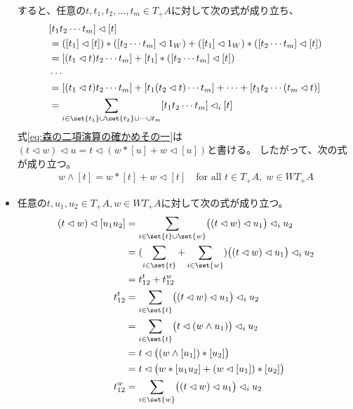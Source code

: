 \begin{itemize}
\begin{equation}
\begin{split}
			\end{split}\end{equation} %
			すると、任意の$t,t_1,t_2,\dots,t_m\in T_+A$に対して次の式が成り立ち、
			\begin{equation*}\begin{split} %
				&[t_1t_2\cdots t_m]\lhd[t] \\
				&= ([t_1]\lhd [t])*([t_2\cdots t_m]\lhd 1_W)
				+ ([t_1]\lhd 1_W)*([t_2\cdots t_m]\lhd [t]) \\
				&= [(t_1\lhd t)t_2\cdots t_m]
				+ [t_1]*([t_2\cdots t_m]\lhd [t]) \\
				&\cdots \\
				&= [(t_1\lhd t)t_2\cdots t_m] + [t_1(t_2\lhd t)\cdots t_m]
				+ \cdots + [t_1t_2\cdots (t_m\lhd t)] \\
				&= \sum_{i\in \set{t_1}\cup\set{t_2}\cup\cdots\cup{t_m}}
				[t_1t_2\cdots t_m]\lhd_i[t]
			\end{split}\end{equation*} %
			式\eqref{eq:森の二項演算の確かめその一}は
			$(t\lhd w)\lhd u=t\lhd (w*[u]+w\lhd[u])$と書ける。
			したがって、次の式が成り立つ。
			\begin{equation}\label{eq:一文字の森の場合の森の二項演算}\begin{split} %
				w\land [t] = w*[t]+w\lhd[t] \quad\text{for all }t\in T_+A,\;w\in WT_+A
			\end{split}\end{equation} %
			\item 任意の$t,u_1,u_2\in T_+A,w\in WT_+A$に対して次の式が成り立つ。
			\begin{equation*}\begin{split} %
				(t\lhd w)\lhd[u_1u_2]
				&= \sum_{i\in \set{t}\cup \set{w}}
					\bigl((t\lhd w)\lhd u_1\bigr)\lhd_i u_2 \\
				&= (\sum_{i\in \set{t}}+\sum_{i\in \set{w}})
					\bigl((t\lhd w)\lhd u_1\bigr)\lhd_i u_2 \\
				&= t_{12}^{t} + t_{12}^{w} \\
				t_{12}^{t} &= \sum_{i\in \set{t}}
					\bigl((t\lhd w)\lhd u_1\bigr)\lhd_i u_2 \\
				&= \sum_{i\in \set{t}}\bigl(t\lhd (w\land u_1)\bigr)\lhd_i u_2 \\
				&= t\lhd \bigl((w\land[u_1])*[u_2]\bigr) \\
				&= t\lhd \bigl(w*[u_1u_2]+(w\lhd[u_1])*[u_2]\bigr) \\
				t_{12}^{w} &= \sum_{i\in \set{w}}
					\bigl((t\lhd w)\lhd u_1\bigr)\lhd_i u_2 \\

\end{split}
\end{equation*}
\end{itemize}
